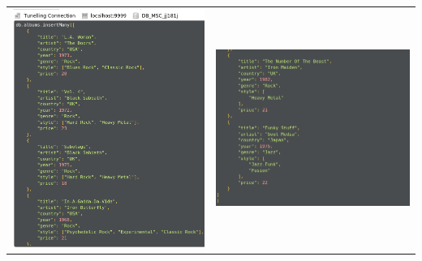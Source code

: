 \documentclass[a4paper, 12pt]{article}
\begin{document}
\begin{tabular}{ c c }
\includegraphics[scale = 0.45]{images/1_a2.png} & \includegraphics[scale = 0.45]{images/1_a3.png}
\end{tabular}
\end{document}
